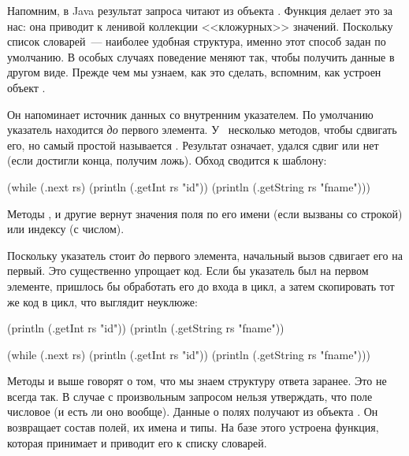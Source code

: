 
Напомним, в Java результат запроса читают из объекта . Функция  делает это за нас: она приводит  к ленивой коллекции <<кложурных>> значений. Поскольку список словарей~--- наиболее удобная структура, именно этот способ задан по умолчанию. В особых случаях поведение  меняют так, чтобы получить данные в другом виде. Прежде чем мы узнаем, как это сделать, вспомним, как устроен объект .

Он напоминает источник данных со внутренним указателем. По умолчанию указатель находится \emph{до} первого элемента. У~ несколько методов, чтобы сдвигать его, но самый простой называется . Результат означает, удался сдвиг или нет (если достигли конца, получим ложь). Обход  сводится к шаблону:

\begin{english}
  \begin{clojure}
(while (.next rs)
  (println (.getInt rs "id"))
  (println (.getString rs "fname")))
  \end{clojure}
\end{english}

Методы ,  и другие вернут значения поля по его имени (если вызваны со строкой) или индексу (с числом).

Поскольку указатель стоит \emph{до} первого элемента, начальный вызов  сдвигает его на первый. Это существенно упрощает код. Если бы указатель был на первом элементе, пришлось бы обработать его до входа в цикл, а затем скопировать тот же код в цикл, что выглядит неуклюже:

\begin{english}
  \begin{clojure}
(println (.getInt rs "id"))
(println (.getString rs "fname"))

(while (.next rs)
  (println (.getInt rs "id"))
  (println (.getString rs "fname")))
  \end{clojure}
\end{english}

Методы  и  выше говорят о том, что мы знаем структуру ответа заранее. Это не всегда так. В случае с произвольным запросом нельзя утверждать, что поле  числовое (и есть ли оно вообще). Данные о полях получают из объекта . Он возвращает состав полей, их имена и типы. На базе этого устроена функция, которая принимает  и приводит его к списку словарей.

